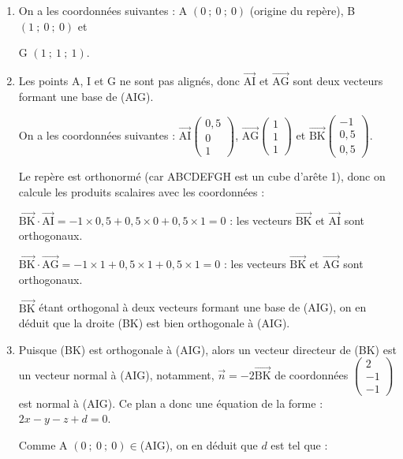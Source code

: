 \documentclass[10pt]{article}
\providecommand{\vect}[1]{\overrightarrow{#1}}
\begin{document}
\begin{enumerate}
\item On a les coordonnées suivantes : A $(0~;~0~;~0)$ (origine du repère), B $(1~;~0~;~0)$ et 

G $(1~;~1~;~1)$.

\item Les points A, I et G ne sont pas alignés, donc $ \vect{\mathrm{AI}} $ et $ \vect{\mathrm{AG}} $ sont deux vecteurs formant une base de (AIG).

On a les coordonnées suivantes : $ \vect{\mathrm{AI}} \begin{pmatrix} 0,5\\0\\1 \end{pmatrix} $, $ \vect{\mathrm{AG}} \begin{pmatrix} 1\\1\\1 \end{pmatrix} $ et $ \vect{\mathrm{BK}} \begin{pmatrix} -1\\0,5\\0,5 \end{pmatrix} $.

Le repère est orthonormé (car ABCDEFGH est un cube d'arête 1), donc on calcule les produits scalaires avec les coordonnées :

$ \vect{\mathrm{BK}}\cdot\vect{\mathrm{AI}} = -1 \times 0,5 + 0,5 \times 0 + 0,5 \times 1 = 0$ : les vecteurs $ \vect{\mathrm{BK}}$ et $\vect{\mathrm{AI}}$ sont orthogonaux.

$ \vect{\mathrm{BK}}\cdot\vect{\mathrm{AG}} = -1 \times 1 + 0,5 \times 1 + 0,5 \times 1 = 0$ : les vecteurs $ \vect{\mathrm{BK}}$ et $\vect{\mathrm{AG}}$ sont orthogonaux.

$ \vect{\mathrm{BK}}$ étant orthogonal à deux vecteurs formant une base de (AIG), on en déduit que la droite (BK) est bien orthogonale à (AIG).

\item Puisque (BK) est orthogonale à (AIG), alors un vecteur directeur de (BK) est un vecteur normal à (AIG), notamment, $\vect{n} = -2\vect{\mathrm{BK}}$ de coordonnées $\begin{pmatrix} 2\\-1\\-1 \end{pmatrix} $ est normal à (AIG). Ce plan a donc une équation de la forme :
\quad
$2x - y - z + d=0$.

Comme A $ (0~;~0~;~0) \in $(AIG), on en déduit que $d$ est tel que :


\end{enumerate}
\end{document}
